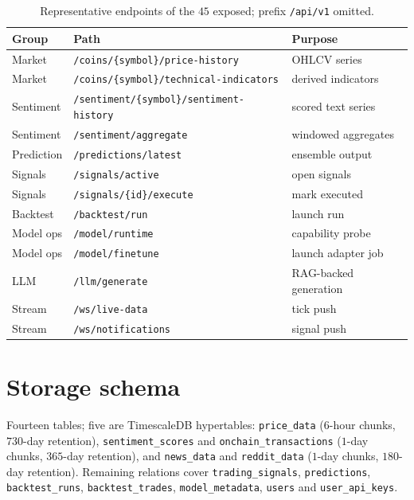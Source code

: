 \documentclass[preprint,12pt,authoryear]{elsarticle}
\begin{document}
\begin{table}[H]\centering\small
\caption{Representative endpoints of the $45$ exposed; prefix \texttt{/api/v1}
omitted.}
\begin{tabular}{@{}lll@{}}
\toprule
Group & Path & Purpose \\
\midrule
Market      & \texttt{/coins/\{symbol\}/price-history}        & OHLCV series \\
Market      & \texttt{/coins/\{symbol\}/technical-indicators} & derived indicators \\
Sentiment   & \texttt{/sentiment/\{symbol\}/sentiment-history}& scored text series \\
Sentiment   & \texttt{/sentiment/aggregate}                   & windowed aggregates \\
Prediction  & \texttt{/predictions/latest}                    & ensemble output \\
Signals     & \texttt{/signals/active}                        & open signals \\
Signals     & \texttt{/signals/\{id\}/execute}                & mark executed \\
Backtest    & \texttt{/backtest/run}                          & launch run \\
Model ops   & \texttt{/model/runtime}                         & capability probe \\
Model ops   & \texttt{/model/finetune}                        & launch adapter job \\
LLM         & \texttt{/llm/generate}                          & RAG-backed generation \\
Stream      & \texttt{/ws/live-data}                          & tick push \\
Stream      & \texttt{/ws/notifications}                      & signal push \\
\bottomrule
\end{tabular}
\end{table}

\section{Storage schema}
\label{app:schema}

Fourteen tables; five are TimescaleDB hypertables: \texttt{price\_data}
($6$-hour chunks, $730$-day retention), \texttt{sentiment\_scores} and
\texttt{onchain\_transactions} ($1$-day chunks, $365$-day retention), and
\texttt{news\_data} and \texttt{reddit\_data} ($1$-day chunks, $180$-day
retention). Remaining relations cover \texttt{trading\_signals},
\texttt{predictions}, \texttt{backtest\_runs}, \texttt{backtest\_trades},
\texttt{model\_metadata}, \texttt{users} and \texttt{user\_api\_keys}.
\end{document}
